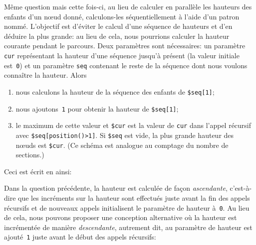Même question mais cette fois-ci, au lieu de calculer en parallèle les
hauteurs des enfants d'un nœud donné, calculons-les
séquentiellement à l'aide d'un patron nommé. L'objectif est d'éviter
le calcul d'une séquence de hauteurs et d'en déduire la plus grande:
au lieu de cela, nous pourrions calculer la hauteur courante pendant
le parcours. Deux paramètres sont nécessaires: un paramètre
\texttt{cur} représentant la hauteur d'une séquence jusqu'à présent
(la valeur initiale est~\texttt{0}) et un paramètre \texttt{seq}
contenant le reste de la séquence dont nous voulons connaître la
hauteur. Alors
\begin{enumerate}

  \item nous calculons la hauteur de la séquence des enfants de
    \texttt{\$seq[1]};

  \item nous ajoutons~\texttt{1} pour obtenir la hauteur de
    \texttt{\$seq[1]};

  \item le maximum de cette valeur et \texttt{\$cur} est la valeur de
    \texttt{cur} dans l'appel récursif avec
    \texttt{\$seq[position()>1]}. Si \texttt{\$seq} est vide, la plus
    grande hauteur des nœuds est \texttt{\$cur}. (Ce schéma est
    analogue au comptage du nombre de sections.)

\end{enumerate}

\noindent Ceci est écrit en \XSLT ainsi:

\bigskip

Dans la question précédente, la hauteur est calculée de façon
\emph{ascendante}, c'est-à-dire que les incréments sur la hauteur sont
effectués juste avant la fin des appels récursifs et de nouveaux
appels initialisent le paramètre de hauteur à~\texttt{0}. Au lieu de
cela, nous pouvons proposer une conception alternative où la hauteur
est incrémentée de manière \emph{descendante}, autrement dit, au
paramètre de hauteur est ajouté~\texttt{1} juste avant le début des
appels récursifs:


